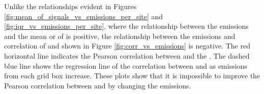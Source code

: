 \newpage
\begin{flushleft}
     
     Unlike the relationships evident in Figures \ref{fig:mean_of_signals_vs_emissions_per_site} and \ref{fig:iqr_vs_emissions_per_site}, where the relationship between the emissions and the mean or \iq of \modelc is positive, the relationship between the emissions and correlation of \modelc and \obsC shown in Figure \ref{fig:corr_vs_emissions} is negative. The red horizontal line indicates the Pearson correlation between \obsC and the \on. The dashed blue line shows the regression line of the correlation between \modelc and \obsC as emissions from each grid box increase. These plots show that it is impossible to improve the Pearson correlation between \modelc and \obsC by changing the emissions.
     
     

\end{flushleft}


